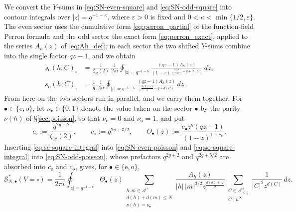 \documentclass[a4paper,reqno]{amsart}
\numberwithin{equation}{section}
\theoremstyle{remark}
\theoremstyle{definition}
\newcommand{\A}{\mathcal{A}}
\newcommand{\zA}{\zeta_{\A}}
\begin{document}
We convert the
$Y$-sums in \eqref{eq:SN-even-square} and \eqref{eq:SN-odd-square} into
contour integrals over $|z|=q^{-1-\kappa}$, where $\varepsilon>0$ is fixed
and $0<\kappa<\min\{1/2,\varepsilon\}$. The even sector uses the
cumulative form \eqref{eq:perron_partial} of the function-field Perron
formula and the odd sector the exact form \eqref{eq:perron_exact}, applied
to the series $A_h(z)$ of \eqref{eq:Ah_def}; in each sector the two shifted
$Y$-sums combine into the single factor $qz-1$, and we obtain
\begin{align}
s_{\mathrm e}(h;C)_{\square}
&=\frac{1}{\zA(2)}\,\frac{1}{2\pi i}
\oint_{|z|=q^{-1-\kappa}}
\frac{(qz-1)A_h(z)}{(1-z)\,z^{\frac{d(h)}{2}-g+d(C)}}\,dz,
\label{eq:se-square-integral}\\
s_{\mathrm o}(h;C)_{\square}
&=\frac{1}{q}\,\frac{1}{2\pi i}
\oint_{|z|=q^{-1-\kappa}}
\frac{(qz-1)A_h(z)}{z^{\frac{d(h)+1}{2}-g+d(C)}}\,dz.
\label{eq:so-square-integral}
\end{align}
From here on the two sectors run in parallel, and we carry them together.
For $\bullet\in\{\mathrm e,\mathrm o\}$, let $\nu_\bullet\in\{0,1\}$ denote
the value taken on the sector $\bullet$ by the parity $\nu(h)$ of
\S\ref{sec:poisson}, so that $\nu_{\mathrm e}=0$ and $\nu_{\mathrm o}=1$, and
put
$$
c_{\mathrm e}:=\frac{q^{2g+2}}{\zA(2)},
\qquad
c_{\mathrm o}:=q^{2g+3/2},
\qquad
\Theta_\bullet(z):=\frac{c_\bullet z^g(qz-1)}{(1-z)^{1-\nu_\bullet}}.
$$
Inserting \eqref{eq:se-square-integral} into \eqref{eq:SN-even-poisson} and
\eqref{eq:so-square-integral} into \eqref{eq:SN-odd-poisson}, whose
prefactors $q^{2g+2}$ and $q^{2g+5/2}$ are absorbed into $c_{\mathrm e}$ and
$c_{\mathrm o}$, gives, for $\bullet\in\{\mathrm e,\mathrm o\}$,
\begin{equation}\label{eq:SN-square-integral}
\mathcal{S}_{N,\bullet}^{*}(V=\square)
=
\frac{1}{2\pi i}
\oint_{|z|=q^{-1-\kappa}}
\Theta_\bullet(z)
\sum_{\substack{h,m\in\A^+\\
d(h)+d(m)\le N\\
\nu(h)=\nu_\bullet}}
\frac{A_h(z)}{|h|\,|m|^{3/2}z^{\frac{d(h)+\nu_\bullet}{2}}}
\sum_{\substack{C\in\A^+_{\le g}\\ C\mid h^\infty}}
\frac{1}{|C|^2z^{d(C)}}\,dz.
\end{equation}
\end{document}
